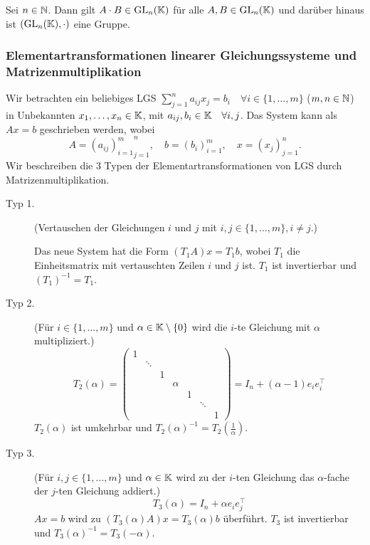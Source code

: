 \begin{propn}
	Sei $ n\in\mathbb N $. Dann gilt $ A \cdot B \in \operatorname{GL}_n(\mathbb K) $ für alle $ A,B \in \operatorname{GL}_n(\mathbb K) $ und darüber hinaus ist $ (\operatorname{GL}_n(\mathbb K),\cdot) $ eine Gruppe.
\end{propn}

\subsubsection{Elementartransformationen linearer Gleichungssysteme und Matrizenmultiplikation}

Wir betrachten ein beliebiges LGS $ \sum_{j=1}^{n} a_{ij}x_j = b_i \quad \forall i \in\{ 1,\ldots,m \} $ ($ m,n\in\mathbb N $) in Unbekannten $ x_1,\ldots,x_n\in\mathbb K $, mit $ a_{ij},b_i\in\mathbb K \quad \forall i,j $. Das System kann als $ Ax = b $ geschrieben werden, wobei
\begin{equation*}
	A = {{(a_{ij})}_{i=1}^m}_{j=1}^n, \quad b = {(b_i)}_{i=1}^m, \quad x = {(x_j)}_{j=1}^n.
\end{equation*}
Wir beschreiben die 3 Typen der Elementartransformationen von LGS durch Matrizenmultiplikation.

\begin{description}
	\item[Typ 1.]
		(Vertauschen der Gleichungen $ i $ und $ j $ mit $ i,j \in \{ 1,\ldots,m \}, i \neq j $.)
		
		Das neue System hat die Form $ (T_1A)x = T_1b $, wobei $ T_1 $ die Einheitsmatrix mit vertauschten Zeilen $ i $ und $ j $ ist. $ T_1 $ ist invertierbar und $ (T_1)^{-1}=T_1 $.
	\item[Typ 2.]
		(Für $ i\in\{ 1,\ldots,m \} $ und $ \alpha\in\mathbb K\setminus\{0\} $ wird die $ i $-te Gleichung mit $ \alpha $ multipliziert.)
		\begin{equation*}
			T_2(\alpha) =
			\left( \begin{matrix}
			1 &  &  &  &  &  &  \\ 
			 & \ddots &  &  &  &  &  \\ 
			 &  & 1 &  &  &  &  \\ 
			 &  &  & \alpha &  &  &  \\ 
			 &  &  &  & 1 &  &  \\ 
			 &  &  &  &  & \ddots &  \\ 
			 &  &  &  &  &  & 1
			\end{matrix} \right)
			= I_n + (\alpha-1)e_ie_i^\top
		\end{equation*}
		$ T_2(\alpha) $ ist umkehrbar und $ T_2(\alpha)^{-1} = T_2(\frac{1}{\alpha}) $.
	\item[Typ 3.]
		(Für $ i,j\in\{ 1,\ldots,m \} $ und $ \alpha\in\mathbb K $ wird zu der $ i $-ten Gleichung das $ \alpha $-fache der $ j $-ten Gleichung addiert.)
		\begin{equation*}
			T_3(\alpha) = I_n + \alpha e_ie_j^\top
		\end{equation*}
		$ Ax=b $ wird zu $ (T_3(\alpha)A)x = T_3(\alpha)b $ überführt. $ T_3 $ ist invertierbar und $ T_3(\alpha)^{-1} = T_3(-\alpha) $.
\end{description}

